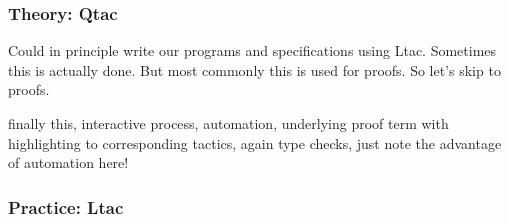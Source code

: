 \subsubsection{Theory: Qtac}

Could in principle write our programs and specifications using Ltac. Sometimes this is actually done.
But most commonly this is used for proofs.
So let's skip to proofs.

finally this, interactive process, automation, underlying proof term with highlighting to corresponding tactics,
again type checks, just note the advantage of automation here!

\subsubsection{Practice: Ltac}




